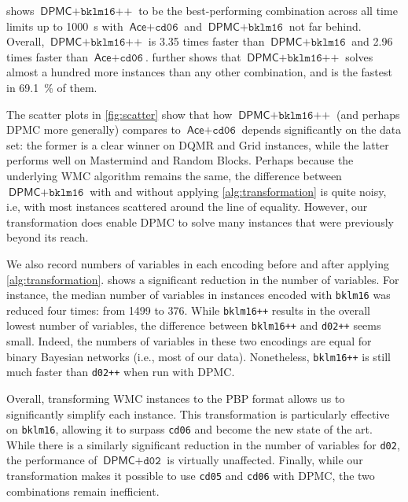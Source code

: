 \documentclass[runningheads]{llncs}
\begin{document}
 shows $\textsf{DPMC}+\texttt{bklm16++}$ to be the
best-performing combination across all time limits up to \SI{1000}{\second} with
$\textsf{Ace} + \texttt{cd06}$ and $\textsf{DPMC}+\texttt{bklm16}$ not far
behind. Overall, $\textsf{DPMC}+\texttt{bklm16++}$ is 3.35 times faster than
$\textsf{DPMC}+\texttt{bklm16}$ and 2.96 times faster than
$\textsf{Ace}+\texttt{cd06}$.  further shows that
$\textsf{DPMC}+\texttt{bklm16++}$ solves almost a hundred more instances than
any other combination, and is the fastest in \SI{69.1}{\percent} of them.

The scatter plots in \cref{fig:scatter} show that how $\textsf{DPMC} +
\texttt{bklm16++}$ (and perhaps \textsf{DPMC} more generally) compares to
$\textsf{Ace} + \texttt{cd06}$ depends significantly on the data set: the former
is a clear winner on DQMR and Grid instances, while the latter performs well on
Mastermind and Random Blocks. Perhaps because the underlying WMC algorithm
remains the same, the difference between $\textsf{DPMC} + \texttt{bklm16}$ with
and without applying \cref{alg:transformation} is quite noisy, i.e, with most
instances scattered around the line of equality. However, our transformation
does enable \textsf{DPMC} to solve many instances that were previously beyond
its reach.

We also record numbers of variables in each encoding before and after applying
\cref{alg:transformation}.  shows a significant reduction in the
number of variables. For instance, the median number of variables in instances
encoded with \texttt{bklm16} was reduced four times: from 1499 to 376. While
\texttt{bklm16++} results in the overall lowest number of variables, the
difference between \texttt{bklm16++} and \texttt{d02++} seems small. Indeed, the
numbers of variables in these two encodings are equal for binary Bayesian
networks (i.e., most of our data). Nonetheless, \texttt{bklm16++} is still much
faster than \texttt{d02++} when run with \textsf{DPMC}.

Overall, transforming WMC instances to the PBP format allows us to significantly
simplify each instance. This transformation is particularly effective on
\texttt{bklm16}, allowing it to surpass \texttt{cd06} and become the new state
of the art. While there is a similarly significant reduction in the number of
variables for \texttt{d02}, the performance of $\textsf{DPMC}+\texttt{d02}$ is
virtually unaffected. Finally, while our transformation makes it possible to use
\texttt{cd05} and \texttt{cd06} with \textsf{DPMC}, the two combinations remain
inefficient.
\end{document}
